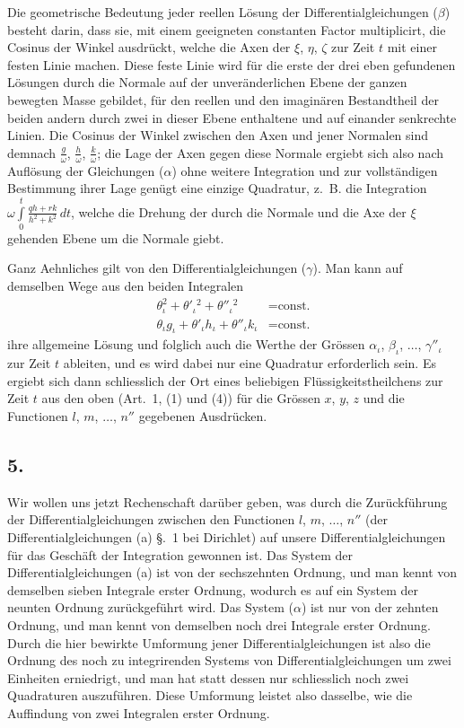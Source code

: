 \documentclass[12pt,a4paper]{book}
\theoremstyle{definition}
\theoremstyle{remark}
\begin{document}
Die geometrische Bedeutung jeder reellen Lösung der Differentialgleichungen ($\beta$) besteht darin, dass sie, mit einem geeigneten constanten Factor multiplicirt, die Cosinus der Winkel ausdrückt, welche die Axen der $\xi$, $\eta$, $\zeta$ zur Zeit $t$ mit einer festen Linie machen. Diese feste Linie wird für die erste der drei eben gefundenen Lösungen durch die Normale auf der unveränderlichen Ebene der ganzen bewegten Masse gebildet, für den reellen und den imaginären Bestandtheil der beiden andern durch zwei in dieser Ebene enthaltene und auf einander senkrechte Linien. Die Cosinus der Winkel zwischen den Axen und jener Normalen sind demnach $\frac{g}{\omega}$, $\frac{h}{\omega}$, $\frac{k}{\omega}$; die Lage der Axen gegen diese Normale ergiebt sich also nach Auflösung der Gleichungen ($\alpha$) ohne weitere Integration und zur vollständigen Bestimmung ihrer Lage genügt eine einzige Quadratur, z.~B. die Integration $\omega\int\limits_0^t\!\frac{qh + rk}{h^2 + k^2}\,dt$, welche die Drehung der durch die Normale und die Axe der $\xi$ gehenden Ebene um die Normale giebt.

Ganz Aehnliches gilt von den Differentialgleichungen ($\gamma$). Man kann auf demselben Wege aus den beiden Integralen
\begin{align*}
\tag{VI} \theta_\iota^2 + \theta'_\iota{}^2 + \theta''_{\iota}{}^2 &= \text{const.}\\
\tag{VII} \theta_\iota g_\iota + \theta'_\iota h_\iota + \theta''_{\iota} k_\iota &= \text{const.}
\end{align*}
ihre allgemeine Lösung und folglich auch die Werthe der Grössen $\alpha_\iota$, $\beta_\iota$, $\ldots$, $\gamma''_{\iota}$ zur Zeit $t$ ableiten, und es wird dabei nur eine Quadratur erforderlich sein. Es ergiebt sich dann schliesslich der Ort eines beliebigen Flüssigkeitstheilchens zur Zeit $t$ aus den oben (Art.~1, (1) und (4)) für die Grössen $x$, $y$, $z$ und die Functionen $l$, $m$, $\ldots$, $n''$ gegebenen Ausdrücken.

\subsection*{5.}

Wir wollen uns jetzt Rechenschaft darüber geben, was durch die Zurückführung der Differentialgleichungen zwischen den Functionen $l$, $m$, $\ldots$, $n''$ (der Differentialgleichungen (a) \S.~1 bei Dirichlet) auf unsere Differentialgleichungen für das Geschäft der Integration gewonnen ist. Das System der Differentialgleichungen (a) ist von der sechszehnten Ordnung, und man kennt von demselben sieben Integrale erster Ordnung, wodurch es auf ein System der neunten Ordnung zurückgeführt wird. Das System ($\alpha$) ist nur von der zehnten Ordnung, und man kennt von demselben noch drei Integrale erster Ordnung. Durch die hier bewirkte Umformung jener Differentialgleichungen ist also die Ordnung des noch zu integrirenden Systems von Differentialgleichungen um zwei Einheiten erniedrigt, und man hat statt dessen nur schliesslich noch zwei Quadraturen auszuführen. Diese Umformung leistet also dasselbe, wie die Auffindung von zwei Integralen erster Ordnung.
\end{document}
